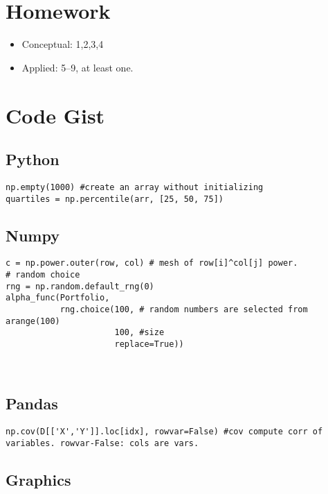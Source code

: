 \documentclass[
  letterpaper,
  DIV=11,
  numbers=noendperiod]{scrreprt}
\providecommand{\tightlist}{%
  \setlength{\itemsep}{0pt}\setlength{\parskip}{0pt}}\usepackage{longtable,booktabs,array}
\begin{document}
\section{Homework}\label{homework-1}

\begin{itemize}
\tightlist
\item
  Conceptual: 1,2,3,4
\item
  Applied: 5--9, at least one.
\end{itemize}

\section{Code Gist}\label{code-gist-3}

\subsection{Python}\label{python-3}

\begin{verbatim}
np.empty(1000) #create an array without initializing
quartiles = np.percentile(arr, [25, 50, 75])
\end{verbatim}

\subsection{Numpy}\label{numpy-3}

\begin{verbatim}
c = np.power.outer(row, col) # mesh of row[i]^col[j] power. 
# random choice 
rng = np.random.default_rng(0)
alpha_func(Portfolio,
           rng.choice(100, # random numbers are selected from arange(100)
                      100, #size
                      replace=True))

    
\end{verbatim}

\subsection{Pandas}\label{pandas-3}

\begin{verbatim}
np.cov(D[['X','Y']].loc[idx], rowvar=False) #cov compute corr of variables. rowvar-False: cols are vars.
\end{verbatim}

\subsection{Graphics}\label{graphics-3}
\end{document}
